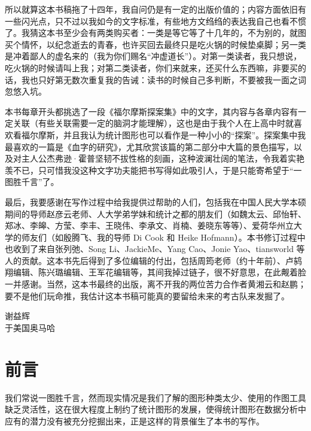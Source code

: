 \documentclass[
  b5paper,
  UTF8,twoside]{book}
\begin{document}
所以就算这本书稿拖了十四年，我自问仍是有一定的出版价值的；内容方面依旧有一些闪光点，只不过以我如今的文字标准，有些地方文绉绉的表达我自己也看不惯了。我猜这本书至少会有两类购买者：一类是等它等了十几年的，不为别的，就图买个情怀，以纪念逝去的青春，也许买回去最终只是吃火锅的时候垫桌脚；另一类是冲着鄙人的虚名来的（我为你们赐名``冲虚道长''）。对第一类读者，我只想说，吃火锅的时候请叫上我；对第二类读者，你们来就来，还买什么东西嘛，非要买的话，我也只好第无数次重复我的告诫：读书的时候自己多判断，不要被我一面之词忽悠入坑。

本书每章开头都挑选了一段《福尔摩斯探案集》中的文字，其内容与各章内容有一定关联（有些关联需要一定的脑洞才能理解），这也是由于我个人在上高中时就喜欢看福尔摩斯，并且我认为统计图形也可以看作是一种小小的``探案''。探案集中我最喜欢的一篇是《血字的研究》，尤其欣赏该篇的第二部分中大篇的景色描写，以及对主人公杰弗逊·霍普坚韧不拔性格的刻画，这种波澜壮阔的笔法，令我着实艳羡不已，只可惜我没这种文字功夫能把书写得如此吸引人，于是只能寄希望于``一图胜千言''了。

最后，我要感谢在写作过程中给我提供过帮助的人们，包括我在中国人民大学本硕期间的导师赵彦云老师、人大学弟学妹和统计之都的朋友们（如魏太云、邱怡轩、郑冰、李皞、方莹、李丰、王晓伟、李承文、肖楠、姜晓东等等）、爱荷华州立大学的师友们（如殷腾飞、我的导师 Di Cook 和 Heike Hofmann）。本书修订过程中也收到了来自张列弛、Song Li、JackieMe、Yang Cao、Jonie Yao、tiansworld 等人的贡献。这本书先后得到了多位编辑的付出，包括周筠老师（约十年前）、卢鸫翔编辑、陈兴璐编辑、王军花编辑等，其间我掉过链子，很不好意思，在此觍着脸一并感谢。当然，这本书最终的出版，离不开我的两位苦力合作者黄湘云和赵鹏；要不是他们玩命推，我估计这本书稿可能真的要留给未来的考古队来发掘了。

\begin{flushright}
谢益辉\\
于美国奥马哈
\end{flushright}

\mainmatter

\hypertarget{forword}{%
\chapter*{前言}\label{forword}}

我们常说一图胜千言，然而现实情况是我们了解的图形种类太少、使用的作图工具缺乏灵活性，这在很大程度上制约了统计图形的发展，使得统计图形在数据分析中应有的潜力没有被充分挖掘出来，正是这样的背景催生了本书的写作。
\end{document}
